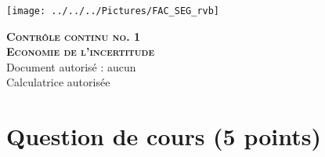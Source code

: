 \documentclass[12pt, a4paper]{exam}
\begin{document}
	\checkboxchar{$\Box$}
	\checkedchar{$\blacksquare$}


\begin{center}
		\texttt{[image: ../../../Pictures/FAC\_SEG\_rvb]}
\end{center}

	\begin{center}
		
		\vspace*{1cm}
		{\textbf{\textsc{\Huge{Contrôle continu  no. 1 \\Economie de l'incertitude}}}}\\
		
		Document autorisé : aucun \\
		Calculatrice autorisée\\
				\vspace*{1cm}
					\end{center}
	\section*{Question de cours (5 points)}
		 
\end{document}
